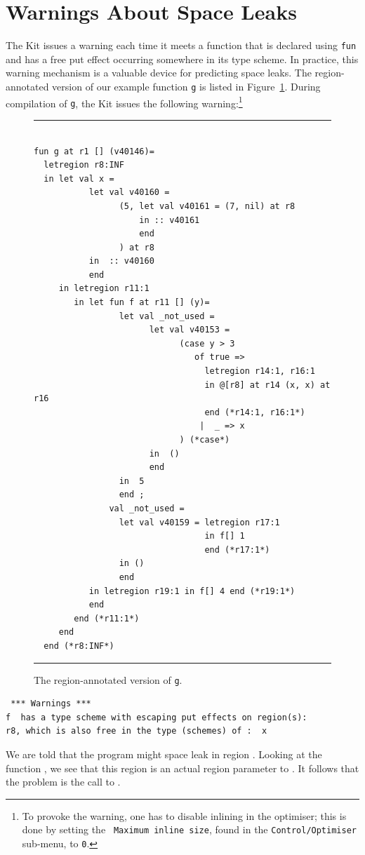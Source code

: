 \documentclass[12pt]{book}
\begin{document}
\section{Warnings About Space Leaks}
The Kit issues a warning each time it meets a 
function that is declared using {\tt fun} and has a free put 
effect occurring somewhere in its type
scheme. In practice, this warning mechanism is a
valuable device for predicting space leaks. 
The region-annotated version of our example function {\tt g} is listed in
Figure~\ref{escape_mulexp.fig}. During compilation of {\tt g}, the Kit issues the
following warning:\footnote{To provoke the warning, one has to disable
inlining in the {\Lam} optimiser; this is done by setting the {\tt
    Maximum inline size}, found in the 
	{\tt Control/Optimiser} sub-menu, to {\tt 0}.}
\begin{figure}
\hrule
\begin{verbatim}

fun g at r1 [] (v40146)= 
  letregion r8:INF 
  in let val x = 
           let val v40160 = 
                 (5, let val v40161 = (7, nil) at r8 
                     in :: v40161 
                     end 
                 ) at r8
           in  :: v40160
           end 
     in letregion r11:1 
        in let fun f at r11 [] (y)= 
                 let val _not_used = 
                       let val v40153 = 
                             (case y > 3 
                                of true => 
                                  letregion r14:1, r16:1 
                                  in @[r8] at r14 (x, x) at r16 
                                  end (*r14:1, r16:1*)
                                 |  _ => x
                             ) (*case*) 
                       in  ()
                       end 
                 in  5
                 end ; 
               val _not_used = 
                 let val v40159 = letregion r17:1 
                                  in f[] 1 
                                  end (*r17:1*) 
                 in () 
                 end 
           in letregion r19:1 in f[] 4 end (*r19:1*)
           end  
        end (*r11:1*)
     end  
  end (*r8:INF*)
\end{verbatim}
\caption{The region-annotated version of {\tt g}.}
\medskip
\hrule
\label{escape_mulexp.fig}
\end{figure}

\begin{verbatim}
 *** Warnings ***
f  has a type scheme with escaping put effects on region(s): 
r8, which is also free in the type (schemes) of :  x
\end{verbatim}
We are told that the program might space
leak in region . Looking at the 
function , we see that this region is an actual
region parameter to . It follows that the problem is the
call to .
\end{document}
